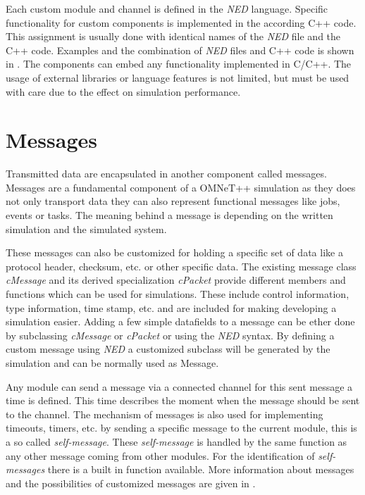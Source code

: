 Each custom module and channel is defined in the \emph{NED} language.
Specific functionality for custom components is implemented in the according C++ code.
This assignment is usually done with identical names of the \emph{NED} file and the C++ code.
Examples and the combination of \emph{NED} files and C++ code is shown in \cite[chapter 3, chapter 4]{OMNETMANUAL}.
The components can embed any functionality implemented in C/C++.
The usage of external libraries or language features is not limited, but must be used with care due to the effect on simulation performance.


\section{Messages}
Transmitted data are encapsulated in another component called messages.
Messages are a fundamental component of a OMNeT++ simulation as they does not only transport data they can also represent functional messages like jobs, events or tasks.
The meaning behind a message is depending on the written simulation and the simulated system.

These messages can also be customized for holding a specific set of data like a protocol header, checksum, etc. or other specific data.
The existing message class \emph{cMessage} and its derived specialization \emph{cPacket} provide different members and functions which can be used for simulations.
These include control information, type information, time stamp, etc. and are included for making developing a simulation easier.
Adding a few simple datafields to a message can be ether done by subclassing \emph{cMessage} or \emph{cPacket} or using the \emph{NED} syntax.
By defining a custom message using \emph{NED} a customized subclass will be generated by the simulation and can be normally used as Message.

Any module can send a message via a connected channel for this sent message a time is defined.
This time describes the moment when the message should be sent to the channel.
The mechanism of messages is also used for implementing timeouts, timers, etc. by sending a specific message to the current module, this is a so called \emph{self-message}.
These \emph{self-message} is handled by the same function as any other message coming from other modules.
For the identification of \emph{self-messages} there is a built in function available.
More information about messages and the possibilities of customized messages are given in \cite[chapter 5]{OMNETMANUAL}.

